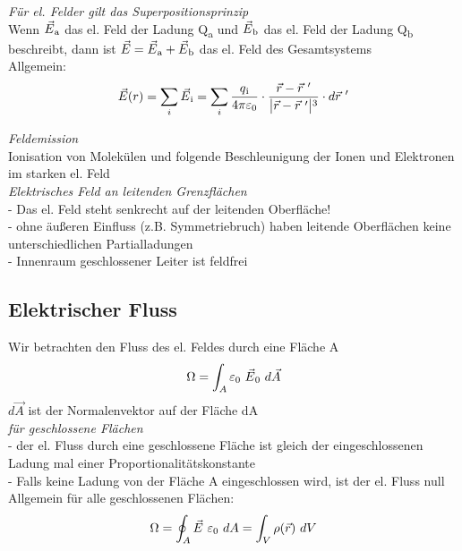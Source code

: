 \documentclass[a4paper,12pt]{report}
\begin{document}
\emph{Für el. Felder gilt das Superpositionsprinzip}\\
Wenn $ \vec{E}\textsubscript{a} $ das el. Feld der Ladung Q\textsubscript{a} und $ \vec{E}\textsubscript{b} $ das el. Feld der Ladung Q\textsubscript{b} beschreibt, dann ist
$ \vec{E}= \vec{E}\textsubscript{a} + \vec{E}\textsubscript{b} $ das el. Feld des Gesamtsystems\\
Allgemein:
\begin{equation}
\vec{E}(r) = \sum\limits_{i} \vec{E}\textsubscript{i} = \sum\limits_{i} \frac{q\textsubscript{i}}{4 \pi \varepsilon\textsubscript{0}} \cdot  \frac{\vec{r} - \vec{r}\ \sp{\prime}}{\bigl| \vec{r} - \vec{r} \ \sp{\prime} \bigl| \textsuperscript{3}}\cdot d \vec{r} \ \sp{\prime}
\end{equation}

\emph{Feldemission}\\
Ionisation von Molekülen und folgende Beschleunigung der Ionen und Elektronen im starken el. Feld\\

\emph{Elektrisches Feld an leitenden Grenzflächen}\\
- Das el. Feld steht senkrecht auf der leitenden Oberfläche!\\
- ohne äußeren Einfluss (z.B. Symmetriebruch) haben leitende Oberflächen keine unterschiedlichen Partialladungen \\
- Innenraum geschlossener Leiter ist feldfrei\\

\subsection{Elektrischer Fluss}
Wir betrachten den Fluss des el. Feldes durch eine Fläche A
\begin{equation}
\Omega = \int_A \varepsilon\textsubscript{0}\ \vec{E}\textsubscript{0}\ d\vec{A}
\end{equation}
$ d\vec{A} $ ist der Normalenvektor auf der Fläche dA\\

\emph{für geschlossene Flächen}\\
- der el. Fluss durch eine geschlossene Fläche ist gleich der eingeschlossenen Ladung mal einer Proportionalitätskonstante\\
- Falls keine Ladung von der Fläche A eingeschlossen wird, ist der el. Fluss null\\

Allgemein für alle geschlossenen Flächen:\\
\begin {equation}
\Omega = \oint_A \vec{E} \ \varepsilon\textsubscript{0}\ dA = \int_V \rho(\vec{r})\ dV
\end{equation}
\end{document}
